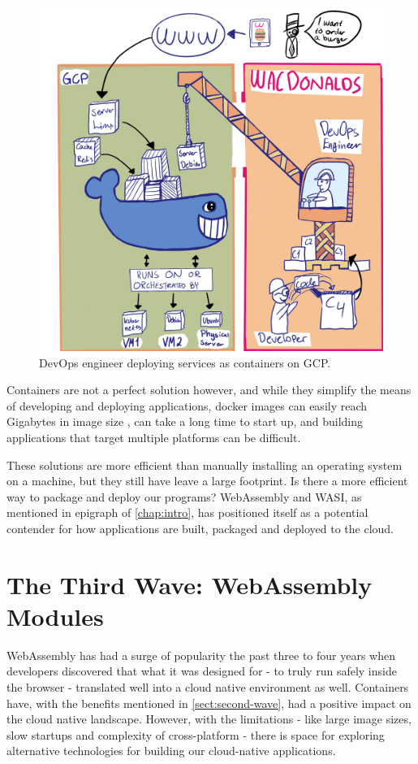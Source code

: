\documentclass[
  table]{report}
\begin{document}
\begin{figure}[H]
\centering
  \includegraphics[width=0.8\columnwidth]{assets/docker-wave.jpg}
  \caption{DevOps engineer deploying services as containers on \ac{GCP}.}
  \label{fig:docker}
\end{figure}

Containers are not a perfect solution however, and while they simplify
the means of developing and deploying applications, docker images can
easily reach Gigabytes in image size \citep{durieux2023}, can take a
long time to start up, and building applications that target multiple
platforms can be difficult.

These solutions are more efficient than manually installing an operating
system on a machine, but they still have leave a large footprint. Is
there a more efficient way to package and deploy our programs?
WebAssembly and \ac{WASI}, as mentioned in epigraph of
\cref{chap:intro}, has positioned itself as a potential contender for
how applications are built, packaged and deployed to the cloud.

\section{The Third Wave: WebAssembly Modules}
\label{sect:third-wave}

WebAssembly has had a surge of popularity the past three to four years
when developers discovered that what it was designed for - to truly run
safely inside the browser - translated well into a cloud native
environment as well. Containers have, with the benefits mentioned in
\cref{sect:second-wave}, had a positive impact on the cloud native
landscape. However, with the limitations - like large image sizes, slow
startups and complexity of cross-platform - there is space for exploring
alternative technologies for building our cloud-native applications.
\end{document}
